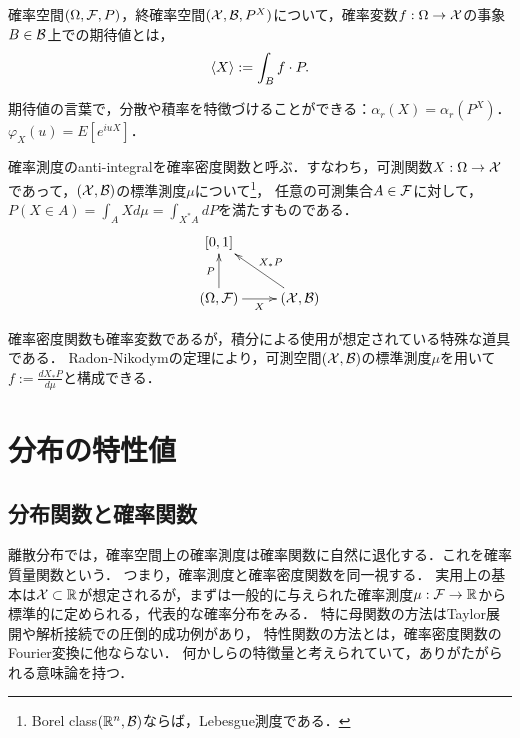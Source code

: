 \documentclass[uplatex,dvipdfmx]{jsreport}
\begin{document}
\begin{definition}
    確率空間$(\Omega,\mathcal{F},P)$，終確率空間$(\mathcal{X},\mathcal{B},P^X)$について，確率変数$f:\Omega\to\mathcal{X}$の事象$B\in\mathcal{B}$上での期待値とは，
    \[\langle X\rangle:=\int_Bf\cdot P.\]
\end{definition}
\begin{remark}
    期待値の言葉で，分散や積率を特徴づけることができる：$\alpha_r(X)=\alpha_r(P^X)$．
    $\varphi_X(u)=E[e^{iuX}]$．
\end{remark}

\begin{definition}[density]
    確率測度のanti-integralを確率密度関数と呼ぶ．すなわち，可測関数$X:\Omega\to\mathcal{X}$であって，$(\mathcal{X},\mathcal{B})$の標準測度$\mu$について\footnote{Borel class$(\mathbb{R}^n,\mathcal{B})$ならば，Lebesgue測度である．}，
    任意の可測集合$A\in\mathcal{F}$に対して，$P(X\in A)=\int_AXd\mu=\int_{X^*A}dP$を満たすものである．
    \[\xymatrix{
        {[0,1]}\\
        (\Omega,\calF)\ar[u]^-{P}\ar[r]_-X&(\X,\B)\ar[ul]_-{X_*P}
    }\]
\end{definition}
\begin{remarks}
    確率密度関数も確率変数であるが，積分による使用が想定されている特殊な道具である．
    Radon-Nikodymの定理により，可測空間$(\mathcal{X},\mathcal{B})$の標準測度$\mu$を用いて
    $f:=\frac{dX_*P}{d\mu}$と構成できる．
\end{remarks}

\section{分布の特性値}

\subsection{分布関数と確率関数}

\begin{tcolorbox}[colframe=ForestGreen, colback=ForestGreen!10!white,breakable,colbacktitle=ForestGreen!40!white,coltitle=black,fonttitle=\bfseries\sffamily,
    title=]
    離散分布では，確率空間上の確率測度は確率関数に自然に退化する．これを確率質量関数という．
    つまり，確率測度と確率密度関数を同一視する．
    実用上の基本は$\mathcal{X}\subset\mathbb{R}$が想定されるが，まずは一般的に与えられた確率測度$\mu:\mathcal{F}\to\mathbb{R}$から標準的に定められる，代表的な確率分布をみる．
    特に母関数の方法はTaylor展開や解析接続での圧倒的成功例があり，
    特性関数の方法とは，確率密度関数のFourier変換に他ならない．
    何かしらの特徴量と考えられていて，ありがたがられる意味論を持つ．
\end{tcolorbox}
\end{document}
